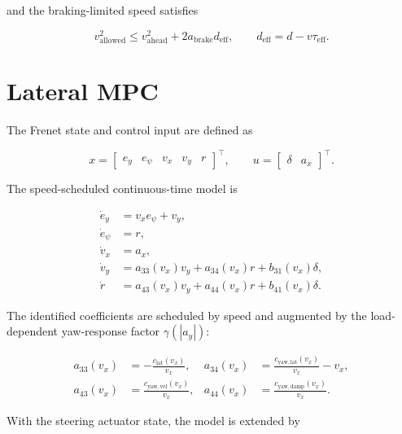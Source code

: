 \documentclass[9pt]{article}
\begin{document}
and the braking-limited speed satisfies

\begin{equation}
v_{\mathrm{allowed}}^2
\leq
v_{\mathrm{ahead}}^2
+ 2a_{\mathrm{brake}}d_{\mathrm{eff}},
\qquad
d_{\mathrm{eff}}
=
d-v\tau_{\mathrm{eff}}.
\label{eq:braking-limit}
\end{equation}

\section{Lateral MPC}

The Frenet state and control input are defined as

\begin{equation}
x=
\begin{bmatrix}
e_y & e_\psi & v_x & v_y & r
\end{bmatrix}^{\!\top},
\qquad
u=
\begin{bmatrix}
\delta & a_x
\end{bmatrix}^{\!\top}.
\label{eq:lateral-state}
\end{equation}

The speed-scheduled continuous-time model is

\begin{align}
\dot e_y &= v_x e_\psi + v_y,
\label{eq:frenet-ey}\\
\dot e_\psi &= r,
\label{eq:frenet-epsi}\\
\dot v_x &= a_x,
\label{eq:frenet-vx}\\
\dot v_y &= a_{33}(v_x)v_y + a_{34}(v_x)r + b_{31}(v_x)\delta,
\label{eq:frenet-vy}\\
\dot r &= a_{43}(v_x)v_y + a_{44}(v_x)r + b_{41}(v_x)\delta.
\label{eq:frenet-r}
\end{align}

The identified coefficients are scheduled by speed and augmented by the
load-dependent yaw-response factor $\gamma(|a_y|)$:

\begin{align}
a_{33}(v_x) &= -\frac{c_{\mathrm{lat}}(v_x)}{v_x},
&
a_{34}(v_x) &= \frac{c_{\mathrm{yaw,lat}}(v_x)}{v_x}-v_x,
\label{eq:identified-a1}\\
a_{43}(v_x) &= \frac{c_{\mathrm{yaw,vel}}(v_x)}{v_x},
&
a_{44}(v_x) &= \frac{c_{\mathrm{yaw,damp}}(v_x)}{v_x}.
\label{eq:identified-a2}
\end{align}

With the steering actuator state, the model is extended by
\end{document}
